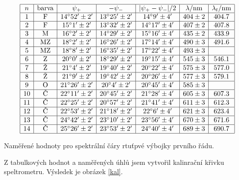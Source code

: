 \documentclass[a4paper,12pt]{article}
\begin{document}
\begin{table}
$$
\begin{array}{|c|c|c|c|c|c|c|}
\hline
n& \mbox{barva}&    \psi_+& -\psi_-& |\psi_+-\psi_-|/2& \lambda/\mbox{nm}& \lambda_t/\mbox{nm} \\ \hline
1&  \mbox{F}&  14^{\circ} 52'\pm 2'&  13^{\circ} 25'\pm 2'&  14^{\circ} 9' \pm 4' &   404\pm 2&   404.7 \\ \hline
2&  \mbox{F}&  15^{\circ} 1'\pm 2'&   13^{\circ} 32'\pm 2'&  14^{\circ} 17' \pm 4'&   407\pm 2&   407.8 \\ \hline
3&  \mbox{M}&  16^{\circ} 2'\pm 2'&   14^{\circ} 29'\pm 2'&  15^{\circ} 16' \pm 4'&   435\pm 2&   433.9 \\ \hline
4&  \mbox{MZ}& 18^{\circ} 2'\pm 2'&   16^{\circ} 26'\pm 2'&  17^{\circ} 14' \pm 4'&   490\pm 3&   491.6 \\ \hline
5&  \mbox{MZ}& 18^{\circ} 8'\pm 2'&   16^{\circ} 35'\pm 2'&  17^{\circ} 22' \pm 4'&   493\pm 3&         \\ \hline
6&  \mbox{Z}&  20^{\circ} 0'\pm 2'&   18^{\circ} 29'\pm 2'&  19^{\circ} 15' \pm 4'&   545\pm 3&   546.1 \\ \hline
7&  \mbox{Ž}&  21^{\circ} 4'\pm 2'&   19^{\circ} 40'\pm 2'&  20^{\circ} 22' \pm 4'&   575\pm 3&   577.0 \\ \hline
8&  \mbox{Ž}&  21^{\circ} 9'\pm 2'&   19^{\circ} 42'\pm 2'&  20^{\circ} 26' \pm 4'&   577\pm 3&   579.1 \\ \hline
9&  \mbox{O}&  21^{\circ} 26'\pm 2'&  20^{\circ} 4'\pm 2'&   20^{\circ} 45' \pm 4'&   585\pm 3&        \\ \hline
10& \mbox{Č}&  22^{\circ} 11'\pm 2'&  20^{\circ} 45'\pm 2'&  21^{\circ} 28' \pm 4'&   605\pm 3&   607.3 \\ \hline
11& \mbox{Č}&  22^{\circ} 25'\pm 2'&  20^{\circ} 57'\pm 2'&  21^{\circ} 41' \pm 4'&   611\pm 3&   612.3 \\ \hline
12& \mbox{Č}&  22^{\circ} 53'\pm 2'&  21^{\circ} 18'\pm 2'&  22^{\circ} 6' \pm 4'&    621\pm 3&   623.4 \\ \hline
13& \mbox{Č}&  24^{\circ} 42'\pm 2'&  23^{\circ} 10'\pm 2'&  23^{\circ} 56' \pm 4'&   670\pm 3&   671.6 \\ \hline
14& \mbox{Č}&  25^{\circ} 26'\pm 2'&  23^{\circ} 53'\pm 2'&  24^{\circ} 40' \pm 4'&   689\pm 3&   690.7 \\ \hline
\end{array}
$$
\caption{Naměřené hodnoty pro spektrální čáry rtuťpvé výbojky prvního řádu.}
\label{Hg}
\end{table}

Z tabulkových hodnot a naměřených úhlů jsem vytvořil kalinrační křivku speltrometru. Výsledek je obrázek \ref{kal}.
\end{document}
